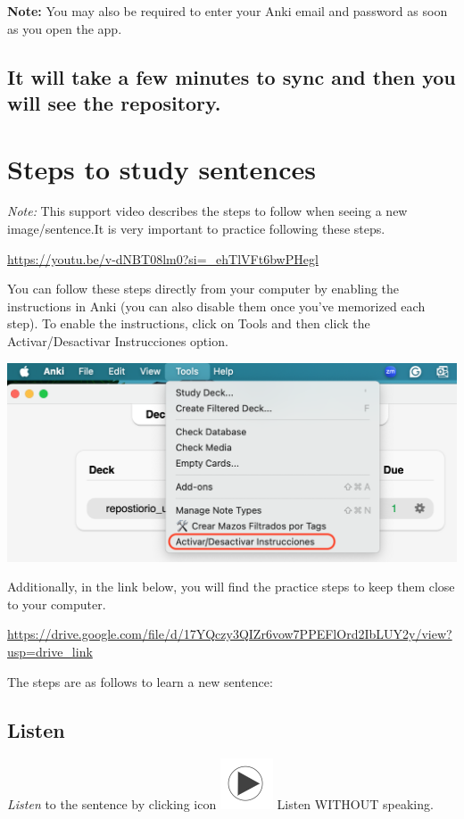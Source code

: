\documentclass[
]{book}
\begin{document}
\textbf{Note:} You may also be required to enter your Anki email and password as soon as you open the app.

\section{It will take a few minutes to sync and then you will see the repository.}\label{it-will-take-a-few-minutes-to-sync-and-then-you-will-see-the-repository.}

\chapter{Steps to study sentences}\label{cross_5}

\emph{Note:} This support video describes the steps to follow when seeing a new image/sentence.It is very important to practice following these steps.

\url{https://youtu.be/v-dNBT08lm0?si=_ehTlVFt6bwPHegl}

You can follow these steps directly from your computer by enabling the instructions in Anki (you can also disable them once you've memorized each step). To enable the instructions, click on Tools and then click the Activar/Desactivar Instrucciones option.

\includegraphics[width=0.7\linewidth]{images/reposit_en/activar_instruc}

Additionally, in the link below, you will find the practice steps to keep them close to your computer.

\url{https://drive.google.com/file/d/17YQczy3QIZr6vow7PPEFlOrd2IbLUY2y/view?usp=drive_link}

The steps are as follows to learn a new sentence:

\section{Listen}\label{cross_6}

\emph{Listen} to the sentence by clicking icon \includegraphics{images/play_icon.png} Listen WITHOUT speaking.
\end{document}
